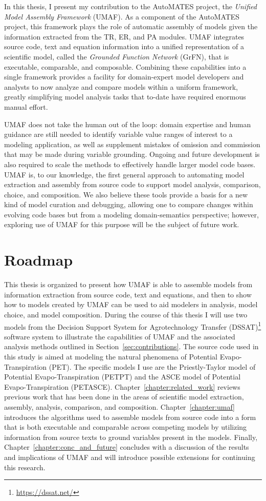 In this thesis, I present my contribution to the AutoMATES project, the \emph{Unified Model Assembly Framework} (UMAF).
As a component of the AutoMATES project, this framework plays the role of automatic assembly of models given the information extracted from the TR, ER, and PA modules.
UMAF integrates source code, text and equation information into a unified representation of a scientific model, called the \emph{Grounded Function Network} (GrFN), that is executable, comparable, and composable.
Combining these capabilities into a single framework provides a facility for domain-expert model developers and analysts to now analyze and compare models within a uniform framework, greatly simplifying model analysis tasks that to-date have required enormous manual effort.

UMAF does not take the human out of the loop: domain expertise and human guidance are still needed to identify variable value ranges of interest to a modeling application, as well as supplement mistakes of omission and commission that may be made during variable grounding.
Ongoing and future development is also required to scale the methods to effectively handle larger model code bases.
UMAF is, to our knowledge, the first general approach to automating model extraction and assembly from source code to support model analysis, comparison, choice, and composition.
We also believe these tools provide a basis for a new kind of model curation and debugging, allowing one to compare changes within evolving code bases but from a modeling domain-semantics perspective; however, exploring use of UMAF for this purpose will be the subject of future work.

\section{Roadmap\label{sec:roadmap}}
This thesis is organized to present how UMAF is able to assemble models from information extraction from source code, text and equations, and then to show how to models created by UMAF can be used to aid modelers in analysis, model choice, and model composition.
During the course of this thesis I will use two models from the Decision Support System for Agrotechnology Transfer (DSSAT)\footnote{\url{https://dssat.net/}} software system \citep{DSSAT} to illustrate the capabilities of UMAF and the associated analysis methods outlined in Section~\ref{sec:contributions}.
The source code used in this study is aimed at modeling the natural phenomena of Potential Evapo-Transpiration (PET).
The specific models I use are the Priestly-Taylor model of Potential Evapo-Transpiration (PETPT) and the ASCE model of Potential Evapo-Transpiration (PETASCE).
Chapter~\ref{chapter:related_work} reviews previous work that has been done in the areas of scientific model extraction, assembly, analysis, comparison, and composition.
Chapter~\ref{chapter:umaf} introduces the algorithms used to assemble models from source code into a form that is both executable and comparable across competing models by utilizing information from source texts to ground variables present in the models.
Finally, Chapter~\ref{chapter:conc_and_future} concludes with a discussion of the results and implications of UMAF and will introduce possible extensions for continuing this research.
